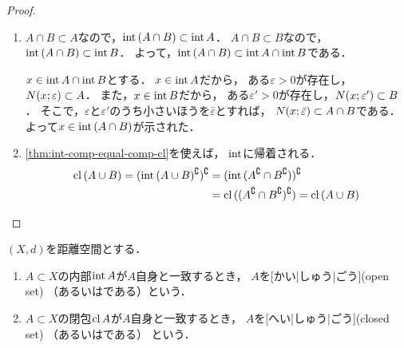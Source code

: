 \documentclass[../sotsu.tex]{subfiles}
\begin{document}
\begin{proof}
    \begin{enumerate}
        \item 
            \quad
            $A \cap B \subset A$なので，$\operatorname{int}{(A \cap B)} \subset \operatorname{int}{A}$．
            $A \cap B \subset B$なので，$\operatorname{int}{(A \cap B)} \subset \operatorname{int}{B}$．
            よって，$\operatorname{int}{(A \cap B)} \subset \operatorname{int}{A} \cap \operatorname{int}{B}$である．

            \quad
            $x \in \operatorname{int}{A} \cap \operatorname{int}{B}$とする．
            $x \in \operatorname{int}{A}$だから，
            ある$\varepsilon > 0$が存在し，$N(x; \varepsilon) \subset A$．
            また，$x \in \operatorname{int}{B}$だから，
            ある$\varepsilon' > 0$が存在し，$N(x; \varepsilon') \subset B$．
            そこで，$\varepsilon$と$\varepsilon'$のうち小さいほうを$\bar{\varepsilon}$とすれば，
            $N(x; \bar{\varepsilon}) \subset A \cap B$である．
            よって$x \in \operatorname{int}{(A \cap B)}$が示された．
        \item 
            \cref{thm:int-comp-equal-comp-cl}を使えば，
            $\operatorname{int}$に帰着される．
            \begin{equation*}
                \begin{split}
                    \operatorname{cl}{(A \cup B)}
                    = ( \operatorname{int}{(A \cup B)^\complement} )^\complement
                    &= ( \operatorname{int}{( A^\complement \cap B^\complement )} )^\complement
                    \\
                    &= \operatorname{cl}{ ( ( A^\complement \cap B^\complement )^\complement ) }
                    = \operatorname{cl}{ ( A \cup B ) }
                \qedhere
                \end{split}
            \end{equation*}
    \end{enumerate}
\end{proof}






\begin{definition}[開集合と閉集合]
    \label{dfn:open-set-and-closed-set}
    \label{dfn:open-set}
    \label{dfn:closed-set}
    $(X, d)$を距離空間とする．
    \begin{enumerate}
        \item 
            $A \subset X$の内部$\operatorname{int}{A}$が$A$自身と一致するとき，
            $A$を[かい|しゅう|ごう](open set)
            （あるいはである）という．
        \item 
            $A \subset X$の閉包$\operatorname{cl}{A}$が$A$自身と一致するとき，
            $A$を[へい|しゅう|ごう](closed set)
            （あるいはである） という．
    \end{enumerate}
\end{definition}
\end{document}
